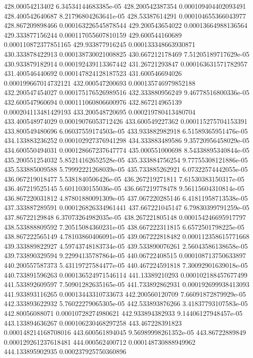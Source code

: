 {428.00054213402 6.34534144683385e-05
428.200542387354 0.000109404402093491
428.400542640687 8.21796804263641e-05
428.53387614291 0.000104655366043977
428.867209898466 0.000163226545878544
429.200543654022 0.00013664988136564
429.333877156244 0.000117055607810159
429.600544160689 0.000110872377851165
429.933877916245 0.000133348663930871
430.333878422913 0.000138730021008825
430.667212178469 7.51205189717629e-05
430.933879182914 0.000192439113367442
431.26721293847 0.000163631571782957
431.400546440692 0.000147824128187523
431.600546694026 0.000199667014732121
432.000547200693 0.000135746979852188
432.200547454027 0.000175176526989516
432.333880956249 9.46778516800336e-05
432.600547960694 0.000111060806600976
432.867214965139 0.000204113481429193
433.200548720695 0.000219780413480704
433.400548974029 0.00019076053712426
433.600549227362 0.000115275704153391
433.800549480696 6.06037559174503e-05
433.933882982918 6.51589365951476e-05
434.133883236252 0.000102927376941298
434.333883489586 9.35720956458029e-05
434.600550494031 0.000128667237647774
435.000551000698 8.54338895340844e-05
435.200551254032 5.85214162652528e-05
435.333884756254 9.77755308121886e-05
435.533885009588 5.79992221268039e-05
435.733885262921 6.07322574442055e-05
436.067219018477 5.5381840506426e-05
436.267219271811 7.61530383150317e-05
436.467219525145 5.6011030155036e-05
436.667219778478 9.56115604310814e-05
436.867220031812 4.87801880091309e-05
437.067220285146 6.41811958713538e-05
437.333887289591 0.000126826334961441
437.667221045147 6.79830399791259e-05
437.86722129848 6.37073264982035e-05
438.267221805148 0.000154246695917797
438.533888809592 7.20515084360231e-05
438.667222311815 6.6572501798225e-05
438.867222565149 4.78103860406091e-05
439.067222818482 0.000112358615771668
439.333889822927 4.59743748183734e-05
439.533890076261 2.56043586138658e-05
439.733890329594 9.22994135787864e-05
440.06722408515 0.000108713750633897
440.200557587373 5.43119727584477e-05
440.467224591818 7.30092901639018e-05
440.733891596263 0.000136524971546114
441.13389210293 0.000102188457677499
441.533892609597 7.50901282635165e-05
441.733892862931 0.000192699938413093
441.933893116265 0.00013443310733673
442.200560120709 7.66091872879929e-05
442.333893622932 5.76022279065305e-05
442.533893876266 3.41837793107583e-05
442.80056088071 0.00010728274980621
442.933894382933 9.14406127948457e-05
443.133894636267 0.000106230468297258
443.467228391823 0.000148214168708016
443.600561894045 9.56989998261352e-05
443.86722889849 0.000129261237618481
444.000562400712 0.000148730888949962
444.133895902935 0.000237925750360896
}
